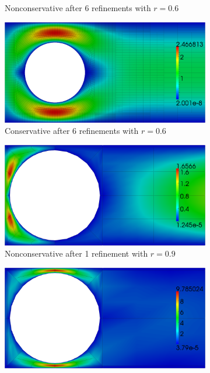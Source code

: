 \documentclass[Proposal.tex]{subfiles}
\begin{document}
\begin{figure}[p]
\begin{subfigure}[t]{0.45\textwidth}
\caption{Nonconservative after 6 refinements with $r=0.6$}
\label{fig:stokesCylinder6NC6}
\end{subfigure}
\begin{subfigure}[t]{0.45\textwidth}
\centering
\includegraphics[width=\textwidth]{figs/StokesCylinder/umag6_C6.png}
\caption{Conservative after 6 refinements with $r=0.6$}
\label{fig:stokesCylinder6C6}
\end{subfigure}
\begin{subfigure}[t]{0.45\textwidth}
\centering
\includegraphics[width=\textwidth]{figs/StokesCylinder/umag9_NC1.png}
\caption{Nonconservative after 1 refinement with $r=0.9$}
\label{fig:stokesCylinder9NC1}
\end{subfigure}
\begin{subfigure}[t]{0.45\textwidth}
\centering
\includegraphics[width=\textwidth]{figs/StokesCylinder/umag9_C1.png}

\end{subfigure}
\end{figure}
\end{document}
